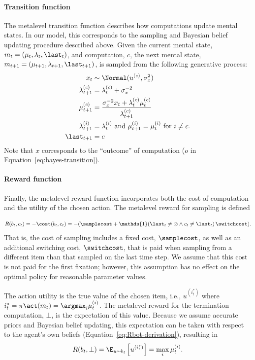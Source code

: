 \paragraph{Transition function}
The metalevel transition function describes how computations update mental states. In our model, this corresponds to the sampling and Bayesian belief updating procedure described above. Given the current mental state, $m_t = (\mathbf{\mu}_t, \mathbf{\lambda}_t, \last_t)$, and computation, $c$, the next mental state, $m_{t+1} = (\mathbf{\mu}_{t+1}, \mathbf{\lambda}_{t+1}, \last_{t+1})$, is sampled from the following generative process:
%
\begin{equation}\label{eq:dynamics}
\begin{aligned}
  x_{t} &\sim \Normal(u^{(c)},\sigma_{x}^{2})\\
  \lambda_{t+1}^{(c)} & =\lambda_{t}^{(c)}+\sigma_{x}^{-2}\\
  \mu_{t+1}^{(c)} & =\frac{\sigma_{x}^{-2}x_{t}+\lambda_{t}^{(c)}\mu_{t}^{(c)}}{\lambda_{t+1}^{(c)}}\\
  \lambda_{t+1}^{(i)} & =\lambda_{t}^{(i)} 
    \text{ and } \mu_{t+1}^{(i)} =\mu_{t}^{(i)} \text{ for }i\neq c.\\
  \last_{t+1} &= c\\
\end{aligned}
\end{equation}
Note that $x$ corresponds to the ``outcome'' of computation ($o$ in Equation~\ref{eq:bayes-transition}).

\paragraph{Reward function}
Finally, the metalevel reward function incorporates both the cost of computation and the utility of the chosen action. The metalevel reward for sampling is defined

$$
R(b_t, c_t) = -\cost(b_t, c_t) = -(\samplecost + \mathds{1}(\last_t \neq \oslash \wedge c_t \neq \last_t)\,\switchcost).
$$
That is, the cost of sampling includes a fixed cost, $\samplecost$, as well as an additional switching cost, $\switchcost$, that is paid when sampling from a different item than that sampled on the last time step. We assume that this cost is not paid for the first fixation; however, this assumption has no effect on the optimal policy for reasonable parameter values.

The action utility is the true value of the chosen item, i.e., $u^{(i^*_t)}$ where $i^*_t = \pi\act(m_t) = \argmax_i \mu_t^{(i)}$. The metalevel reward for the termination computation, $\bot$, is the expectation of this value. Because we assume accurate priors and Bayesian belief updating, this expectation can be taken with respect to the agent's own beliefs (Equation~\ref{eq:Rbot-derivation}), resulting in 
$$
R(b_t, \bot) = \E_{u \sim b_t} \left[ u^{(i^*_t)}\right]
= \max_i \mu_t^{(i)}.
$$


